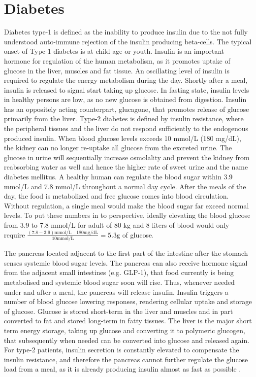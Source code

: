 \section{Diabetes}
Diabetes type-1 is defined as the inability to produce insulin due to the not fully understood auto-immune rejection of the insulin producing beta-cells. The typical onset of Type-1 diabetes is at child age or youth. Insulin is an important hormone for regulation of the human metabolism, as it promotes uptake of glucose in the liver, muscles and fat tissue. An oscillating level of insulin is required to regulate the energy metabolism during the day. Shortly after a meal, insulin is released to signal start taking up glucose. In fasting state, insulin levels in healthy persons are low, as no new glucose is obtained from digestion. Insulin has an oppositely acting counterpart, glucagone, that promotes release of glucose primarily from the liver. Type-2 diabetes is defined by insulin resistance, where the peripheral tissues and the liver do not respond sufficiently to the endogenous produced insulin. When blood glucose levels exceeds 10 mmol/L (180 mg/dL), the kidney can no longer re-uptake all glucose from the excreted urine. The glucose in urine will sequentially increase osmolality and prevent the kidney from reabsorbing water as well and hence the higher rate of sweet urine and the name diabetes mellitus. A healthy human can regulate the blood sugar within 3.9 mmol/L and 7.8 mmol/L throughout a normal day cycle. After the meals of the day, the food is metabolized and free glucose comes into blood circulation. Without regulation, a single meal would make the blood sugar far exceed normal levels\cite{silverthorn2010human,Cowart1990}.
To put these numbers in to perspective, ideally elevating the blood glucose from 3.9 to 7.8 mmol/L for adult of 80 kg and 8 liters of blood would only require
$ \frac { (7.8-3.9) \textrm{mmol/L} \quad 180\textrm{mg/dL} }
		{ 10 \textrm{mmol/L} } = 5.3 \textrm{g}$ of glucose.

The pancreas located adjacent to the first part of the intestine after the stomach senses systemic blood sugar levels. The pancreas can also receive hormone signal from the adjacent small intestines (e.g. GLP-1), that food currently is being metabolised and systemic blood sugar soon will rise. Thus, whenever needed under and after a meal, the pancreas will release insulin. Insulin triggers a number of blood glucose lowering responses, rendering cellular uptake and storage of glucose. Glucose is stored short-term in the liver and muscles and in part converted to fat and stored long-term in fatty tissues. The liver is the major short term energy storage, taking up glucose and converting it to polymeric glucogen, that subsequently when needed can be converted into glucose and released again. For type-2 patients, insulin secretion is constantly elevated to compensate the insulin resistance, and therefore the pancreas cannot further regulate the glucose load from a meal, as it is already producing insulin almost as fast as possible \cite{silverthorn2010human}.

